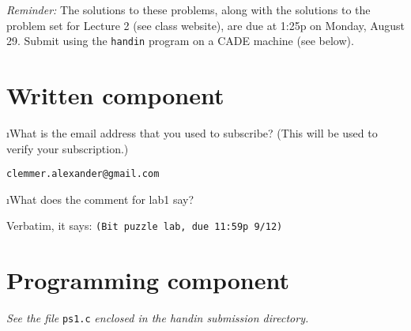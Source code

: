 \documentclass[fleqn]{article}
\begin{document}

\textit{Reminder:} The solutions to these problems, along with the solutions to the problem set for Lecture 2 (see class website), are due at 1:25p on Monday, August 29. Submit using the \texttt{handin} program on a CADE machine (see below).

\section{Written component}

\bee
\i What is the email address that you used to subscribe? (This will be used to verify your subscription.)

 \begin{solution}
   \texttt{clemmer.alexander@gmail.com}
 \end{solution}

\i What does the comment for lab1 say?

 \begin{solution}
   Verbatim, it says: \texttt{(Bit puzzle lab, due 11:59p 9/12)}
 \end{solution}

\ene

\section{Programming component}

\textit{See the file} \texttt{ps1.c} \textit{enclosed in the handin submission directory.}
\end{document}
